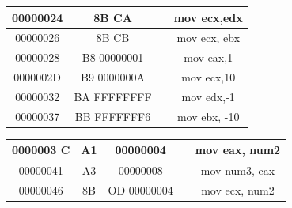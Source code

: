 \documentclass[10pt]{book}
\begin{document}
\begin{center}
\begin{center}
\begin{center}
\begin{center}
\begin{center}
\begin{center}
\begin{tabular}{|c|c|c|c|}
\hline
00000024 & 8B CA &  & mov ecx,edx \\
\hline
00000026 & 8B CB &  & mov ecx, ebx \\
\hline
00000028 & B8 00000001 &  & mov eax,1 \\
\hline
0000002D & B9 0000000A &  & mov ecx,10 \\
\hline
00000032 & BA FFFFFFFF &  & mov edx,-1 \\
\hline
00000037 & BB FFFFFFF6 &  & mov ebx, -10 \\
\hline
\end{tabular}
\end{center}

\begin{center}
\begin{tabular}{|c|c|c|c|c|}
\hline
0000003 C & A1 & 00000004 &  & mov eax, num2 \\
\hline
00000041 & A3 & 00000008 &  & mov num3, eax \\
\hline
00000046 & 8B & OD 00000004 &  & mov ecx, num2 \\


\end{tabular}
\end{center}
\end{center}
\end{center}
\end{center}
\end{center}
\end{center}
\end{document}
